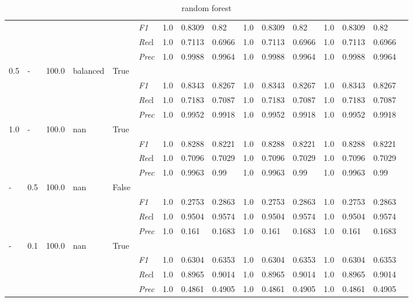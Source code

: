 \begin{table}[]
\begin{tabularx}{\textwidth}{XXXXX|X|XXX|XXX|XXXX}
& & & & & \textit{F1} & 1.0 & 0.8309 & 0.82 & 1.0 & 0.8309        & 0.82        & 1.0        & 0.8309        & 0.82        \\
& & & & & \textit{Rec}l & 1.0 & 0.7113 & 0.6966    & 1.0 & 0.7113    & 0.6966    & 1.0    & 0.7113    & 0.6966    \\
& & & & & \textit{Prec} & 1.0 & 0.9988 & 0.9964 & 1.0 & 0.9988 & 0.9964 & 1.0 & 0.9988 & 0.9964 \\ \midrule
0.5 & - & 100.0 & balanced & True& & & & & & & & & \\
& & & & & \textit{F1} & 1.0 & 0.8343 & 0.8267 & 1.0 & 0.8343        & 0.8267        & 1.0        & 0.8343        & 0.8267        \\
& & & & & \textit{Rec}l & 1.0 & 0.7183 & 0.7087    & 1.0 & 0.7183    & 0.7087    & 1.0    & 0.7183    & 0.7087    \\
& & & & & \textit{Prec} & 1.0 & 0.9952 & 0.9918 & 1.0 & 0.9952 & 0.9918 & 1.0 & 0.9952 & 0.9918 \\ \midrule
1.0 & - & 100.0 & nan & True& & & & & & & & & \\
& & & & & \textit{F1} & 1.0 & 0.8288 & 0.8221 & 1.0 & 0.8288        & 0.8221        & 1.0        & 0.8288        & 0.8221        \\
& & & & & \textit{Rec}l & 1.0 & 0.7096 & 0.7029    & 1.0 & 0.7096    & 0.7029    & 1.0    & 0.7096    & 0.7029    \\
& & & & & \textit{Prec} & 1.0 & 0.9963 & 0.99 & 1.0 & 0.9963 & 0.99 & 1.0 & 0.9963 & 0.99 \\ \midrule
- & 0.5 & 100.0 & nan & False& & & & & & & & & \\
& & & & & \textit{F1} & 1.0 & 0.2753 & 0.2863 & 1.0 & 0.2753        & 0.2863        & 1.0        & 0.2753        & 0.2863        \\
& & & & & \textit{Rec}l & 1.0 & 0.9504 & 0.9574    & 1.0 & 0.9504    & 0.9574    & 1.0    & 0.9504    & 0.9574    \\
& & & & & \textit{Prec} & 1.0 & 0.161 & 0.1683 & 1.0 & 0.161 & 0.1683 & 1.0 & 0.161 & 0.1683 \\ \midrule
- & 0.1 & 100.0 & nan & True& & & & & & & & & \\
& & & & & \textit{F1} & 1.0 & 0.6304 & 0.6353 & 1.0 & 0.6304        & 0.6353        & 1.0        & 0.6304        & 0.6353        \\
& & & & & \textit{Rec}l & 1.0 & 0.8965 & 0.9014    & 1.0 & 0.8965    & 0.9014    & 1.0    & 0.8965    & 0.9014    \\
& & & & & \textit{Prec} & 1.0 & 0.4861 & 0.4905 & 1.0 & 0.4861 & 0.4905 & 1.0 & 0.4861 & 0.4905 \\ \midrule
\end{tabularx}
\caption{random forest}
\label{tab:all_results_random_forest}
\end{table}

